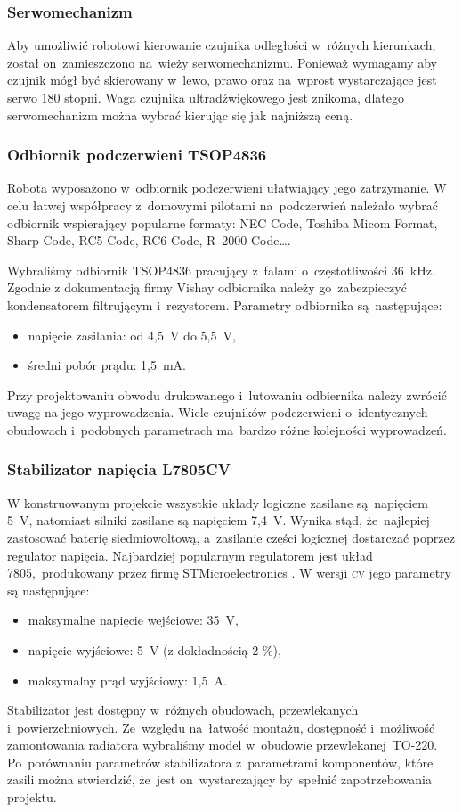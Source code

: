 \documentclass[11pt]{article}
\begin{document}
\subsubsection{Serwomechanizm}
Aby umożliwić robotowi kierowanie czujnika odległości w~różnych kierunkach, został on~zamieszczono na~wieży serwomechanizmu.
Ponieważ wymagamy aby czujnik mógł być skierowany w~lewo, prawo oraz na~wprost wystarczające jest serwo 180 stopni.
Waga czujnika ultradźwiękowego jest znikoma, dlatego serwomechanizm można wybrać kierując się jak najniższą ceną.

\subsubsection{Odbiornik podczerwieni TSOP4836}
Robota wyposażono w~odbiornik podczerwieni ułatwiający jego zatrzymanie.
W celu łatwej współpracy z~domowymi pilotami na~podczerwień należało wybrać odbiornik wspierający popularne formaty: NEC Code, Toshiba Micom Format, Sharp Code, RC5 Code, RC6 Code, R–2000 Code\dots.

Wybraliśmy odbiornik TSOP4836 pracujący z~falami o~częstotliwości 36~\si{\kilo\hertz}. Zgodnie z dokumentacją \cite{ir_datasheet} firmy Vishay
 odbiornika należy go~zabezpieczyć kondensatorem filtrującym i~rezystorem. Parametry odbiornika są~następujące:
\begin{itemize}
	\item napięcie zasilania: od 4,5~\si{\volt} do 5,5~\si{\volt},
	\item średni pobór prądu: 1,5~\si{\milli\ampere}.
\end{itemize}
Przy projektowaniu obwodu drukowanego i~lutowaniu odbiernika należy zwrócić uwagę na jego wyprowadzenia.
Wiele czujników podczerwieni o~identycznych obudowach i~podobnych parametrach ma~bardzo różne kolejności wyprowadzeń.

\subsubsection{Stabilizator napięcia L7805CV}
W konstruowanym projekcie wszystkie układy logiczne zasilane są~napięciem 5~\si{\volt}, natomiast silniki zasilane są napięciem  7,4~\si{\volt}.
Wynika stąd, że~najlepiej zastosować baterię siedmiowoltową, a~zasilanie części logicznej dostarczać poprzez regulator napięcia. Najbardziej popularnym regulatorem jest układ 7805,~produkowany przez firmę STMicroelectronics \cite{stab_datasheet}. 
W wersji \textsc{cv} jego parametry są następujące:
\begin{itemize}
	\item maksymalne napięcie wejściowe: 35~\si{\volt},
	\item napięcie wyjściowe: 5~\si{\volt} (z dokładnością 2 \%),
	\item maksymalny prąd wyjściowy: 1,5~\si{\ampere}.
\end{itemize}
Stabilizator jest dostępny w~różnych obudowach, przewlekanych i~powierzchniowych. Ze~względu na~łatwość montażu, dostępność i~możliwość zamontowania radiatora wybraliśmy model w~obudowie przewlekanej~TO-220.
Po~porównaniu parametrów stabilizatora z~parametrami komponentów, które zasili można stwierdzić, że~jest on~wystarczający by~spełnić zapotrzebowania projektu.
\end{document}
